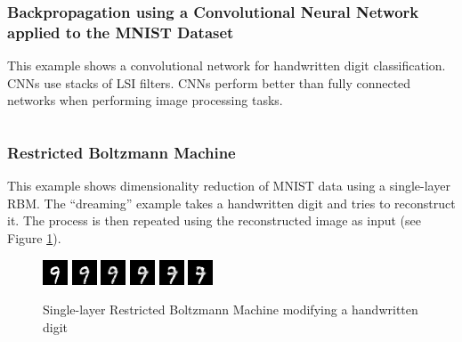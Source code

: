 \documentclass[a4paper,twoside,10pt]{article}
\begin{document}
\subsubsection{Backpropagation using a Convolutional Neural Network applied to the MNIST Dataset}\label{app:mnistcnn}
This example shows a convolutional network for handwritten digit classification.
\acp{CNN} use stacks of \ac{LSI} filters.
\acp{CNN} perform better than fully connected networks when performing image processing tasks.
\inputminted[frame=lines,linenos,fontsize=\small]{python}{mnist-convolutional.py}

\subsubsection{Restricted Boltzmann Machine}\label{app:rbm}
This example shows dimensionality reduction of MNIST data using a single-layer \ac{RBM}.
The ``dreaming'' example takes a handwritten digit and tries to reconstruct it.
The process is then repeated using the reconstructed image as input (see Figure \ref{fig:dream}).
\begin{figure}[htbp]
  \begin{center}
    \includegraphics[width=.15\textwidth]{dream0}
    \includegraphics[width=.15\textwidth]{dream1}
    \includegraphics[width=.15\textwidth]{dream2}
    \includegraphics[width=.15\textwidth]{dream3}
    \includegraphics[width=.15\textwidth]{dream4}
    \includegraphics[width=.15\textwidth]{dream5}
    \caption{Single-layer Restricted Boltzmann Machine modifying a handwritten digit\label{fig:dream}}
  \end{center}
\end{figure}
\end{document}
